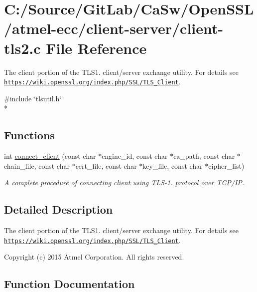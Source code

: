 \hypertarget{client-tls2_8c}{}\section{C\+:/\+Source/\+Git\+Lab/\+Ca\+Sw/\+Open\+S\+S\+L/atmel-\/ecc/client-\/server/client-\/tls2.c File Reference}
\label{client-tls2_8c}


The client portion of the T\+L\+S1. client/server exchange utility. For details see \href{https://wiki.openssl.org/index.php/SSL/TLS_Client}{\tt https\+://wiki.\+openssl.\+org/index.\+php/\+S\+S\+L/\+T\+L\+S\+\_\+\+Client}.  


{\ttfamily \#include \char`\"{}tlsutil.\+h\char`\"{}}\\*
\subsection*{Functions}
\begin{DoxyCompactItemize}
\item 
int \hyperlink{client-tls2_8c_af001045c3edf01693c5826c12c8bf563}{connect\+\_\+client} (const char $\ast$engine\+\_\+id, const char $\ast$ca\+\_\+path, const char $\ast$chain\+\_\+file, const char $\ast$cert\+\_\+file, const char $\ast$key\+\_\+file, const char $\ast$cipher\+\_\+list)
\begin{DoxyCompactList}\small\item\em A complete procedure of connecting client using T\+L\+S-\/1. protocol over T\+C\+P/\+I\+P. \end{DoxyCompactList}\end{DoxyCompactItemize}


\subsection{Detailed Description}
The client portion of the T\+L\+S1. client/server exchange utility. For details see \href{https://wiki.openssl.org/index.php/SSL/TLS_Client}{\tt https\+://wiki.\+openssl.\+org/index.\+php/\+S\+S\+L/\+T\+L\+S\+\_\+\+Client}. 

Copyright (c) 2015 Atmel Corporation. All rights reserved.

\subsection{Function Documentation}
\hypertarget{client-tls2_8c_af001045c3edf01693c5826c12c8bf563}{}

